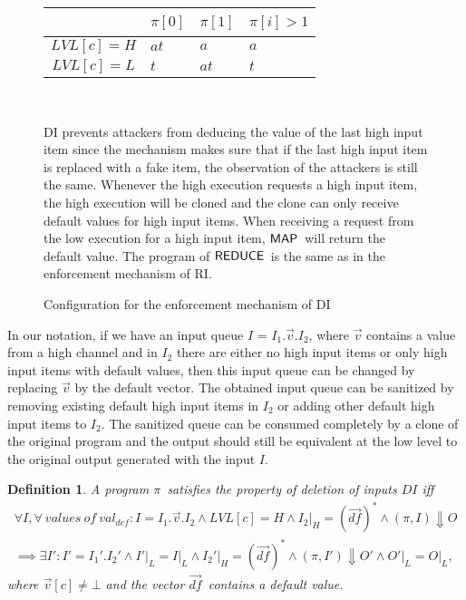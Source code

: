 \documentclass[10pt,a4paper,oneside]{article}
\newtheorem{definition}{Definition}[section]
\def\execution#1#2#3{\ensuremath{(#1, #2)\Downarrow#3}}
\def\defseq#1{\ensuremath{#1 = (\defvec)^*}}
\def\loweq#1#2{\ensuremath{\restrict{#1}{L} = \restrict{#2}{L}}}
\def\restrict#1#2{\ensuremath{{#1}|_{#2}}}
\def\LVL{\ensuremath{LVL}}
\def\TPV{\ensuremath{T_{R}}}
\def\chnl{\ensuremath{c}}
\def\NIL{\ensuremath{\bot}}
\def\sanserif#1{\ensuremath{\sf #1}}
\def\REDUCE{\ensuremath{\sanserif{REDUCE}}}
\def\MAP{\ensuremath{\sanserif{MAP}}}
\def\defVal{\ensuremath{val_{def}}}
\def\defvec{\ensuremath{\vec{df}}}
\def\Prog{\ensuremath{\pi}}
\def\Progl#1{\ensuremath{\Prog[#1]}}
\def\tgetask{\ensuremath{at}}
\def\task{\ensuremath{a}}
\def\tget{\ensuremath{t}}
\def\tnoaction{\ensuremath{-}}
\def\ttellput{\ensuremath{at}}
\def\tindex#1{\ensuremath{\Progl{#1}}}
\def\figdesc#1{
\noindent
\centering
\begin{minipage}{0.95\columnwidth}
\vspace{3pt}
\begin{footnotesize}
#1
\end{footnotesize}
\end{minipage}
}
\begin{document}
\begin{figure}[!t]
{\begin{tabular}{|c|>{\centering\arraybackslash}p{13pt}|>{\centering\arraybackslash}p{13pt}|>{\centering\arraybackslash}p{34pt}|}
\hline
~ & \tindex{0} & \tindex{1} & $\tindex{i} > 1$\\
\hline
$\LVL[\chnl] = H$ & \tgetask & \task & \task \\
\hline
$\LVL[\chnl] = L$ & \tget & \tgetask & \tget\\
\hline
\end{tabular}
} \hfill
\subfloat[\TPV]{
\label{fig:table:DI:REDUCE}
\begin{tabular}{|c|>{\centering\arraybackslash}p{13pt}|>{\centering\arraybackslash}p{13pt}|>{\centering\arraybackslash}p{34pt}|}
\hline
~ &  \tindex{0} & \tindex{1} & $\tindex{i} > 1$\\
\hline
$\LVL[\chnl] = H$ & \ttellput & \tnoaction & \tnoaction \\
\hline
$\LVL[\chnl] = L$ & \tnoaction & \ttellput & \tnoaction \\
\hline
\end{tabular}
}\\
\figdesc{DI prevents attackers from deducing the value of the last high input item since the mechanism makes sure that if the last high input item is replaced with a fake item, the observation of the attackers is still the same. Whenever the high execution requests a high input item, the high execution will be cloned and the clone can only receive default values for high input items. When receiving a request from the low execution for a high input item, \MAP\ will return the default value. The program of \REDUCE\ is the same as in the enforcement mechanism of RI.}
\caption{Configuration for the enforcement mechanism of DI}
\label{fig:table:DI}
\end{figure}


In our notation, if we have an input queue $I$ = $I_1.\vec{v}.I_2$, where $\vec{v}$ contains a value from a high channel and in $I_2$ there are either no high input items or only high input items with default values, then this input queue can be changed by replacing $\vec{v}$ by the default vector. The obtained input queue can be sanitized by removing existing default high input items in $I_2$ or adding other default high input items to $I_2$. The sanitized queue can be consumed completely by a clone of the original program and the output should still be equivalent at the low level to the original output generated with the input $I$.

\begin{definition}\label{def:DI}
A program \Prog ~satisfies the property of \emph{deletion of inputs} $DI$ iff
\begin{multline*}
	\forall I, \forall\ values\ of\ \defVal: I = I_1.\vec{v}.I_2 \wedge LVL[\chnl] = H \wedge \defseq{I_2|_H} \wedge \execution{\Prog}{I}{O} \\ \implies
	\exists I': I' = I_1'.I_2' \wedge \loweq{I'}{I} \wedge \defseq{I_2'|_H} \wedge \execution{\Prog}{I'}{O'} \wedge \loweq{O'}{O},
\end{multline*} where $\vec{v}[\chnl] \neq \NIL$ and the vector \defvec\ contains a default value.
\end{definition}
\end{document}
